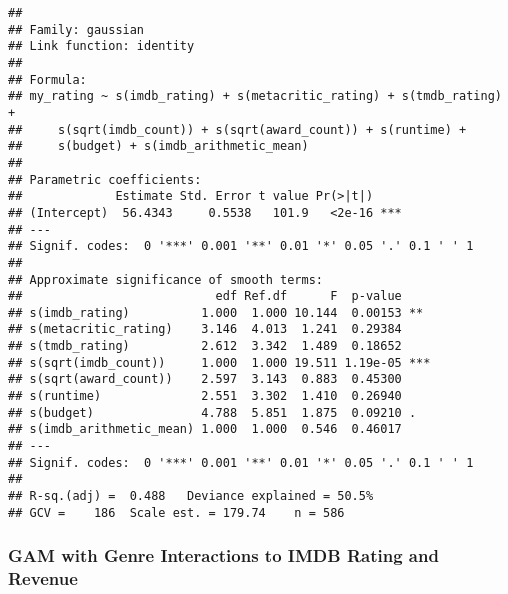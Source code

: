 \documentclass[
]{article}
\begin{document}
\begin{verbatim}
## 
## Family: gaussian 
## Link function: identity 
## 
## Formula:
## my_rating ~ s(imdb_rating) + s(metacritic_rating) + s(tmdb_rating) + 
##     s(sqrt(imdb_count)) + s(sqrt(award_count)) + s(runtime) + 
##     s(budget) + s(imdb_arithmetic_mean)
## 
## Parametric coefficients:
##             Estimate Std. Error t value Pr(>|t|)    
## (Intercept)  56.4343     0.5538   101.9   <2e-16 ***
## ---
## Signif. codes:  0 '***' 0.001 '**' 0.01 '*' 0.05 '.' 0.1 ' ' 1
## 
## Approximate significance of smooth terms:
##                           edf Ref.df      F  p-value    
## s(imdb_rating)          1.000  1.000 10.144  0.00153 ** 
## s(metacritic_rating)    3.146  4.013  1.241  0.29384    
## s(tmdb_rating)          2.612  3.342  1.489  0.18652    
## s(sqrt(imdb_count))     1.000  1.000 19.511 1.19e-05 ***
## s(sqrt(award_count))    2.597  3.143  0.883  0.45300    
## s(runtime)              2.551  3.302  1.410  0.26940    
## s(budget)               4.788  5.851  1.875  0.09210 .  
## s(imdb_arithmetic_mean) 1.000  1.000  0.546  0.46017    
## ---
## Signif. codes:  0 '***' 0.001 '**' 0.01 '*' 0.05 '.' 0.1 ' ' 1
## 
## R-sq.(adj) =  0.488   Deviance explained = 50.5%
## GCV =    186  Scale est. = 179.74    n = 586
\end{verbatim}

\hypertarget{gam-with-genre-interactions-to-imdb-rating-and-revenue}{%
\subsubsection{GAM with Genre Interactions to IMDB Rating and
Revenue}\label{gam-with-genre-interactions-to-imdb-rating-and-revenue}}
\end{document}
